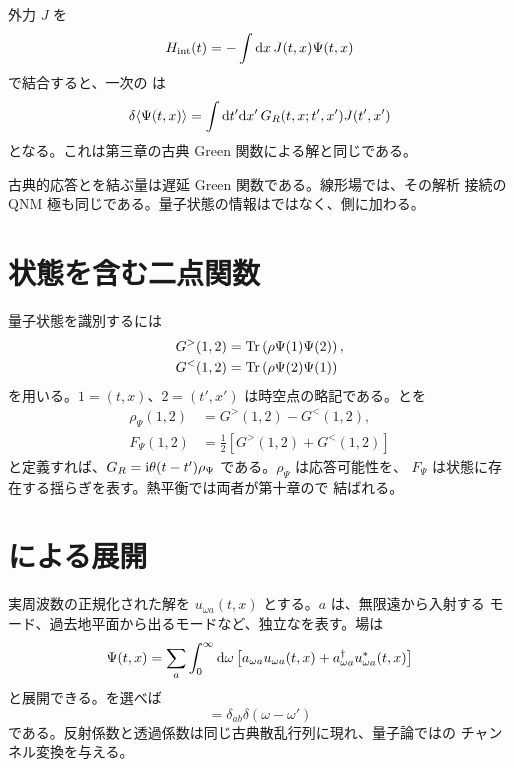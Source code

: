 外力 $J$ を
\begin{equation}
H_{\mathrm{int}}(t)
=
-\int\mathrm{d} x\,J(t,x)\Psi(t,x)
\end{equation}
で結合すると、一次の は
\begin{equation}
\delta\langle\Psi(t,x)\rangle
=
\int\mathrm{d} t'\mathrm{d} x'\,
G_R(t,x;t',x')J(t',x')
\label{eq:kubo-master-response}
\end{equation}
となる。これは第三章の古典 Green 関数による解と同じである。

\begin{principlebox}
古典的応答とを結ぶ量は遅延 Green 関数である。線形場では、その解析
接続の QNM 極も同じである。量子状態の情報はではなく、側に加わる。
\end{principlebox}

\section{状態を含む二点関数}

量子状態を識別するには 
\begin{align}
G^>(1,2)
&=
\operatorname{Tr}\left(
\rho\Psi(1)\Psi(2)
\right),
\label{eq:wightman-greater}
\\
G^<(1,2)
&=
\operatorname{Tr}\left(
\rho\Psi(2)\Psi(1)
\right)
\label{eq:wightman-less}
\end{align}
を用いる。$1=(t,x)$、$2=(t',x')$ は時空点の略記である。とを
\begin{align}
\rho_\Psi(1,2)
&=
G^>(1,2)-G^<(1,2),
\label{eq:master-spectral-function}
\\
F_\Psi(1,2)
&=
\frac{1}{2}
\left[
G^>(1,2)+G^<(1,2)
\right]
\label{eq:master-symmetric-correlator}
\end{align}
と定義すれば、$G_R=\mathrm{i}\theta(t-t')\rho_\Psi$ である。$\rho_\Psi$ は応答可能性を、
$F_\Psi$ は状態に存在する揺らぎを表す。熱平衡では両者が第十章ので
結ばれる。

\section{による展開}

実周波数の正規化された解を $u_{\omega a}(t,x)$ とする。$a$ は、無限遠から入射する
モード、過去地平面から出るモードなど、独立なを表す。場は
\begin{equation}
\Psi(t,x)
=
\sum_a
\int_0^\infty\mathrm{d}\omega
\left[
a_{\omega a}u_{\omega a}(t,x)
+a^\dagger_{\omega a}u^*_{\omega a}(t,x)
\right]
\label{eq:master-mode-expansion}
\end{equation}
と展開できる。を選べば
\begin{equation}
[a_{\omega a},a^\dagger_{\omega' b}]
=
\delta_{ab}\delta(\omega-\omega')
\end{equation}
である。反射係数と透過係数は同じ古典散乱行列に現れ、量子論ではの
チャンネル変換を与える。

